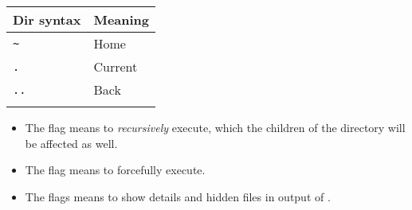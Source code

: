 \documentclass{article}
\begin{document}
\begin{minipage}{0.2\textwidth}
      \begin{table}[H]
            \begin{tabular}{ll}
                  \textbf{Dir syntax} & \textbf{Meaning} \\ \hline
                  \lstinline|~|       & Home             \\ \arrayrulecolor{lightgray}\hline
                  \lstinline|.|       & Current          \\ \arrayrulecolor{lightgray}\hline
                  \lstinline|..|      & Back             \\ \arrayrulecolor{lightgray}\hline
            \end{tabular}
      \end{table}

\end{minipage}
\begin{itemize}
      \item The flag  means to \emph{recursively} execute, which the children of the directory will be affected as well.
      \item The flag  means to forcefully execute.
      \item The flags  means to show details and hidden files in output of .
\end{itemize}
\end{document}
